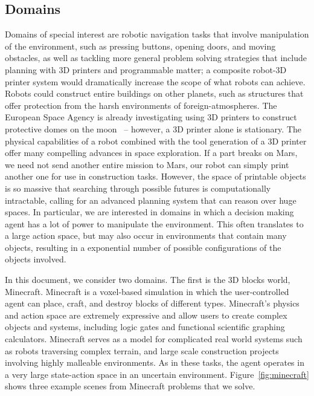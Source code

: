 \documentclass[11pt]{article}
\begin{document}
\subsection{Domains}
Domains of special interest are robotic navigation tasks that involve manipulation of the environment, such as pressing buttons, opening doors, and moving obstacles, as well as tackling more general problem solving strategies that include planning with 3D printers and programmable matter; a composite robot-3D printer system would dramatically increase the scope of what robots can achieve. Robots could construct entire buildings on other planets, such as structures that offer protection from the harsh environments of foreign-atmospheres. The European Space Agency is already investigating using 3D printers to construct protective domes on the moon~\cite{ceccanti20103D,Cesaretti2014430} -- however, a 3D printer alone is stationary. The physical capabilities of a robot combined with the tool generation of a 3D printer offer many compelling advances in space exploration. If a part breaks on Mars, we need not send another entire mission to Mars, our robot can simply print another one for use in construction tasks. However, the space of printable objects is so massive that searching through possible futures is computationally intractable, calling for an advanced planning system that can reason over huge spaces. In particular, we are interested in domains in which a decision making agent has a lot of power to manipulate the environment. This often translates to a large action space, but may also occur in environments that contain many objects, resulting in a exponential number of possible configurations of the objects involved.

In this document, we consider two domains. The first is the 3D blocks world, Minecraft. Minecraft is a voxel-based simulation in which the user-controlled agent can place, craft, and destroy blocks of different types.
Minecraft's physics and action space are extremely expressive and allow users to create complex objects and systems, including logic gates and functional scientific graphing calculators.
Minecraft serves as a model for complicated real world systems such as robots traversing complex terrain, and large scale construction projects involving highly malleable environments.  As in these tasks, the agent operates in a
very large state-action space in an uncertain environment. Figure~\ref{fig:minecraft} shows three example scenes from Minecraft problems that we solve.
\end{document}
